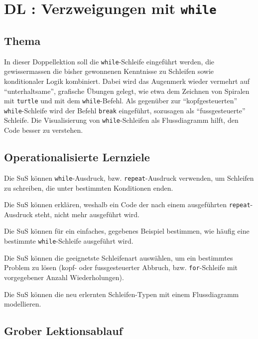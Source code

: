 \section{DL \themycounter: Verzweigungen mit \texorpdfstring{\lstinline|while|}{while}}
\begin{myExBox}[title=DL \themycounter]
\subsection*{Thema}
In dieser Doppellektion soll die \lstinline|while|-Schleife eingeführt werden, die gewissermassen die bisher gewonnenen Kenntnisse zu Schleifen sowie konditionaler Logik kombiniert. Dabei wird das Augenmerk wieder vermehrt auf \enquote{unterhaltsame}, grafische Übungen gelegt, wie etwa dem Zeichnen von Spiralen mit \lstinline|turtle| und mit dem \lstinline|while|-Befehl. Als gegenüber zur \enquote{kopfgesteuerten} \lstinline|while|-Schleife wird der Befehl \lstinline|break| eingeführt, sozusagen als \enquote{fussgesteuerte} Schleife. Die Visualisierung von \lstinline|while|-Schleifen als Flussdiagramm hilft, den Code besser zu verstehen.

\subsection*{Operationalisierte Lernziele}
\begin{todolist}
    \item Die SuS können \lstinline|while|-Ausdruck, bzw. \lstinline|repeat|-Ausdruck verwenden, um Schleifen zu schreiben, die unter bestimmten Konditionen enden.
    \item Die SuS können erklären, weshalb ein Code der nach einem ausgeführten \lstinline|repeat|-Ausdruck steht, nicht mehr ausgeführt wird.
    \item Die SuS können für ein einfaches, gegebenes Beispiel bestimmen, wie häufig eine bestimmte \lstinline|while|-Schleife ausgeführt wird.
    \item Die SuS können die geeignetste Schleifenart auswählen, um ein bestimmtes Problem zu lösen (kopf- oder fussgesteuerter Abbruch, bzw. \lstinline|for|-Schleife mit vorgegebener Anzahl Wiederholungen).
    \item Die SuS können die neu erlernten Schleifen-Typen mit einem Flussdiagramm modellieren.
\end{todolist}

\subsection*{Grober Lektionsablauf}


\end{myExBox}
